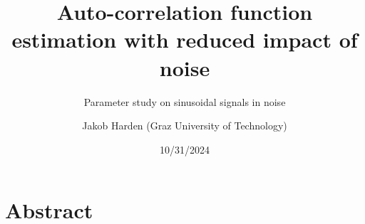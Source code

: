 \documentclass[11pt,aspectratio=169]{beamer}
\def\PresTitle{Auto-correlation function estimation with reduced impact of noise}
\def\PresSubTitle{Parameter study on sinusoidal signals in noise}
\def\PresDate{10/31/2024}
\def\PresAuthorFirstname{Jakob}
\def\PresAuthorLastname{Harden}
\def\PresAuthor{\PresAuthorFirstname{} \PresAuthorLastname{}}
\def\PresAuthorAffiliation{Graz University of Technology}
\begin{document}
	\author{\PresAuthor{} (\PresAuthorAffiliation{})}
	\title{\PresTitle{}}
	\subtitle{\PresSubTitle{}}
	\date{\PresDate{}}
	\begin{frame}[plain]
		\maketitle
	\end{frame}
	\section*{Abstract}
\end{document}
